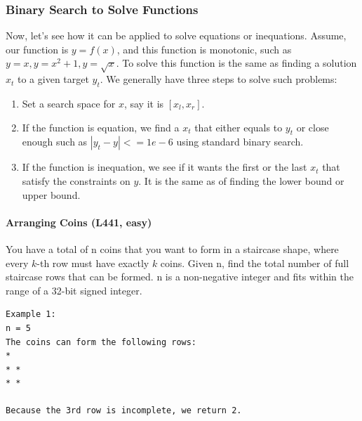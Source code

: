 \documentclass[main.tex]{subfiles}
\begin{document}
\subsubsection{Binary Search to Solve Functions}
Now, let's see how it can be applied to solve equations or inequations. Assume, our function is $y = f(x)$, and this function is monotonic, such as $y = x, y = x^2+1, y = \sqrt{x}$. To solve this function is the same as finding a solution $x_t$ to a given target $y_t$. We generally have three steps to solve such problems: %
\begin{enumerate}
    \item Set a search space for $x$, say it is $[x_l, x_r]$. 
    \item If the function is equation, we find a $x_t$ that either equals to $y_t$ or close enough such as $|y_t - y| <= 1e-6$ using standard binary search. 
    \item If the function is inequation, we see if it wants the first or the last $x_t$ that satisfy the constraints on $y$. It is the same as of finding the lower bound or upper bound. 
\end{enumerate}

\paragraph{Arranging Coins (L441, easy)} You have a total of n coins that you want to form in a staircase shape, where every $k$-th row must have exactly $k$ coins. Given n, find the total number of full staircase rows that can be formed. n is a non-negative integer and fits within the range of a 32-bit signed integer.
\begin{lstlisting}[numbers=none]
Example 1:
n = 5
The coins can form the following rows:
*
* *
* *

Because the 3rd row is incomplete, we return 2.
\end{lstlisting}
\end{document}
